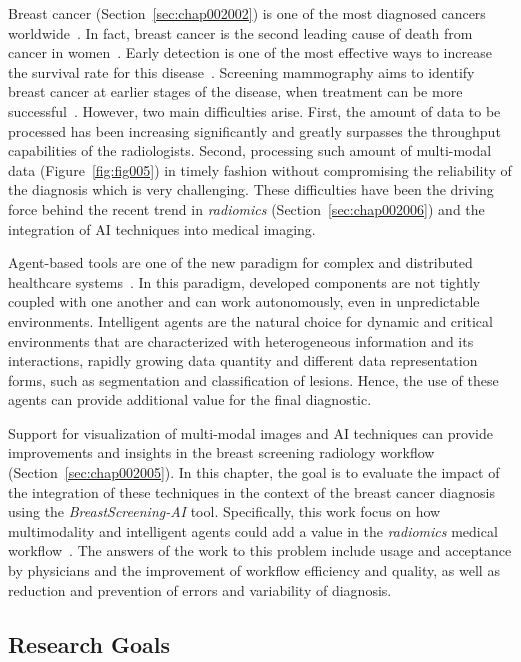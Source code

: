 Breast cancer (Section~\ref{sec:chap002002}) is one of the most diagnosed cancers worldwide~\cite{desantis2016breast, torre2015global}.
In fact, breast cancer is the second leading cause of death from cancer in women~\cite{doi:10.3322/caac.21492}.
Early detection is one of the most effective ways to increase the survival rate for this disease~\cite{welch2016breast, saadatmand2015influence}.
Screening mammography aims to identify breast cancer at earlier stages of the disease, when treatment can be more successful~\cite{McKinney2020}.
However, two main difficulties arise.
First, the amount of data to be processed has been increasing significantly and greatly surpasses the throughput capabilities of the radiologists.
Second, processing such amount of multi-modal data (Figure~\ref{fig:fig005}) in timely fashion without compromising the reliability of the diagnosis which is very challenging.
These difficulties have been the driving force behind the recent trend in {\it radiomics} (Section~\ref{sec:chap002006}) and the integration of \ac{AI} techniques into medical imaging.

Agent-based tools are one of the new paradigm for complex and distributed healthcare systems~\cite{10.1145/3206505.3206555, esteva2019guide}.
In this paradigm, developed components are not tightly coupled with one another and can work autonomously, even in unpredictable environments.
Intelligent agents are the natural choice for dynamic and critical environments that are characterized with heterogeneous information and its interactions, rapidly growing data quantity and different data representation forms, such as segmentation and classification of lesions.
Hence, the use of these agents can provide additional value for the final diagnostic.

Support for visualization of multi-modal images and \ac{AI} techniques can provide improvements and insights in the breast screening radiology workflow (Section~\ref{sec:chap002005}).
In this chapter, the goal is to evaluate the impact of the integration of these techniques in the context of the breast cancer diagnosis using the {\it BreastScreening-AI} tool.
Specifically, this work focus on how multimodality and intelligent agents could add a value in the {\it radiomics} medical workflow~\cite{calisto2017mimbcdui}.
The answers of the work to this problem include usage and acceptance by physicians and the improvement of workflow efficiency and quality, as well as reduction and prevention of errors and variability of diagnosis.

\subsection{Research Goals}
\label{sec:chap005001002}

